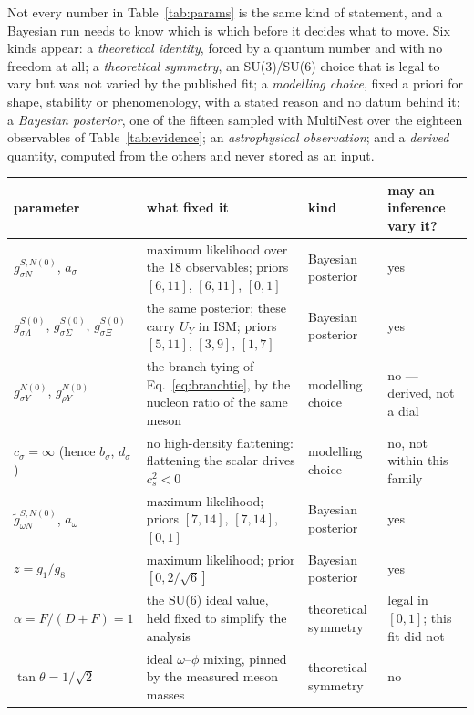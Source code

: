\documentclass[aps,prc,onecolumn,superscriptaddress,nofootinbib,10pt]{revtex4-2}
\begin{document}
Not every number in Table~\ref{tab:params} is the same kind of statement, and a
Bayesian run needs to know which is which before it decides what to move. Six
kinds appear: a \emph{theoretical identity}, forced by a quantum number and with
no freedom at all; a \emph{theoretical symmetry}, an SU(3)/SU(6) choice that is
legal to vary but was not varied by the published fit; a \emph{modelling
choice}, fixed a priori for shape, stability or phenomenology, with a stated
reason and no datum behind it; a \emph{Bayesian posterior}, one of the fifteen
sampled with MultiNest over the eighteen observables of
Table~\ref{tab:evidence}; an \emph{astrophysical observation}; and a
\emph{derived} quantity, computed from the others and never stored as an input.

\begin{table}[h]
\centering
\small
\begin{tabular}{@{}p{}p{}p{}p{}@{}}
\toprule
parameter & what fixed it & kind & may an inference vary it? \\
\midrule
$g^{S,N(0)}_{\sigma N}$, $a_\sigma$
  & maximum likelihood over the 18 observables; priors $[6,11]$, $[6,11]$, $[0,1]$
  & Bayesian posterior & yes \\
$g^{S(0)}_{\sigma\Lambda}$, $g^{S(0)}_{\sigma\Sigma}$, $g^{S(0)}_{\sigma\Xi}$
  & the same posterior; these carry $U_Y$ in ISM; priors $[5,11]$, $[3,9]$, $[1,7]$
  & Bayesian posterior & yes \\
$g^{N(0)}_{\sigma Y}$, $g^{N(0)}_{\rho Y}$
  & the branch tying of Eq.~\eqref{eq:branchtie}, by the nucleon ratio of the same meson
  & modelling choice & no --- derived, not a dial \\
$c_\sigma = \infty$ (hence $b_\sigma$, $d_\sigma$)
  & no high-density flattening: flattening the scalar drives $c_s^2 < 0$
  & modelling choice & no, not within this family \\
$\tilde{g}^{S,N(0)}_{\omega N}$, $a_\omega$
  & maximum likelihood; priors $[7,14]$, $[7,14]$, $[0,1]$
  & Bayesian posterior & yes \\
$z = g_1/g_8$
  & maximum likelihood; prior $[0, 2/\sqrt{6}]$
  & Bayesian posterior & yes \\
$\alpha = F/(D+F) = 1$
  & the SU(6) ideal value, held fixed to simplify the analysis
  & theoretical symmetry & legal in $[0,1]$; this fit did not \\
$\tan\theta = 1/\sqrt{2}$
  & ideal $\omega$--$\phi$ mixing, pinned by the measured meson masses
  & theoretical symmetry & no \\

\end{tabular}
\end{table}
\end{document}
